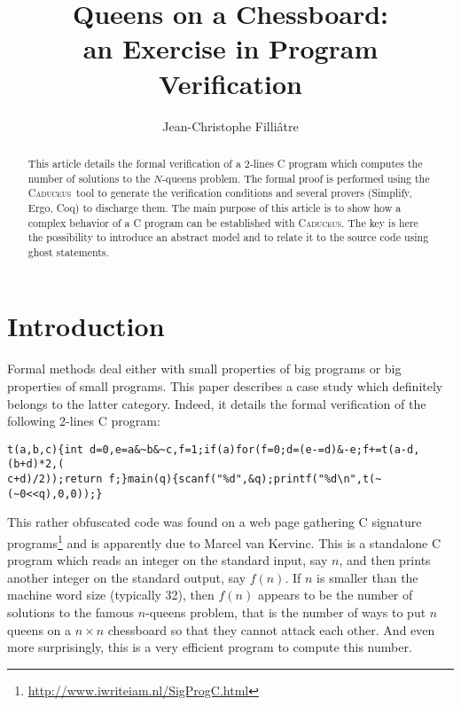 \documentclass[a4paper]{llncs}
\newcommand{\caduceus}{\textsc{Caduceus}}
\begin{document}
\title{Queens on a Chessboard: \\
       an Exercise in Program Verification}
\author{Jean-Christophe Filli\^atre}
\maketitle

\begin{abstract}
  This article details the formal verification of a 2-lines C program
  which computes the number of solutions to the $N$-queens problem.
  The formal proof is performed using the \caduceus\ tool to generate
  the verification conditions and several provers (Simplify, Ergo,
  Coq) to discharge them. The main purpose of this article is to show
  how a complex behavior of a C program can be established with
  \caduceus. The key is here the possibility to introduce an abstract
  model and to relate it to the source code using ghost statements.
\end{abstract}

\section{Introduction}

Formal methods deal either with small properties of big programs or
big properties of small programs. This paper describes a case study
which definitely belongs to the latter category.
Indeed, it details the formal verification of the following 2-lines C program:
{\small%
\begin{verbatim}
t(a,b,c){int d=0,e=a&~b&~c,f=1;if(a)for(f=0;d=(e-=d)&-e;f+=t(a-d,(b+d)*2,(
c+d)/2));return f;}main(q){scanf("%d",&q);printf("%d\n",t(~(~0<<q),0,0));}
\end{verbatim}}
\noindent 
This rather obfuscated code was found on a web page gathering C signature
programs\footnote{\url{http://www.iwriteiam.nl/SigProgC.html}} and is
apparently due to Marcel van Kervinc. This is a standalone C program
which reads an integer on the standard input, say $n$, and then prints another
integer on the standard output, say $f(n)$. If $n$ is smaller than the
machine word size (typically 32), then
$f(n)$ appears to be the number of solutions to the famous $n$-queens
problem, that is the number of ways to put $n$ queens on a $n\times n$
chessboard so that they cannot attack each other. And even more
surprisingly, this is a very efficient program to compute this number.
\end{document}
